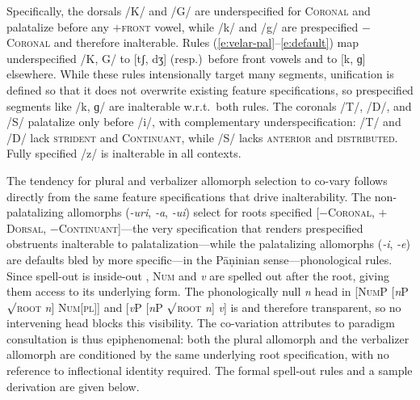 \documentclass[11pt,letterpaper]{article}
\newcommand{\feature}[1]{\textsc{#1}}
\newcommand{\featspec}[2]{\ensuremath{#1}\textsc{#2}}
\begin{document}
Specifically, the dorsals /K/ and /G/ are underspecified for \feature{Coronal} and palatalize before any \featspec{+}{front} vowel,
while /k/ and /g/ are prespecified \featspec{-}{Coronal} and therefore inalterable.
Rules (\ref{e:velar-pal}--\ref{e:default}) map underspecified /K, G/ to [tʃ, dʒ] (resp.)~before front vowels and to [k, ɡ] elsewhere.
While these rules intensionally target many segments,
unification is defined so that it does not overwrite existing feature specifications,
so prespecified segments like /k, ɡ/ are inalterable w.r.t.~both rules.
The coronals /T/, /D/, and /S/ palatalize only before /i/, with complementary underspecification:
/T/ and /D/ lack \feature{strident} and \feature{Continuant},
while /S/ lacks \feature{anterior} and \feature{distributed}.
Fully specified /z/ is inalterable in all contexts.

The tendency for plural and verbalizer allomorph selection to co-vary follows directly from the same feature specifications that drive inalterability.
The non-palatalizing allomorphs (\textit{-uri}, \textit{-a}, \textit{-ui}) select for roots specified
[\featspec{-}{Coronal}, \featspec{+}{Dorsal}, \featspec{-}{Continuant}]---the very specification that renders prespecified obstruents inalterable to palatalization---while the palatalizing allomorphs (\textit{-i}, \textit{-e}) are defaults bled by more specific---in the Pāṇinian sense---phonological rules.
Since spell-out is inside-out \citep{Bobaljik:00},
\textsc{Num} and \textit{v} are spelled out after the root,
giving them access to its underlying form.
The phonologically null \textit{n} head in
[\textsc{NumP} [\textit{n}P $\surd$\textsc{root} \textit{n}] \textsc{Num}[\textsc{pl}]]
and [\textit{v}P [\textit{n}P $\surd$\textsc{root} \textit{n}] \textit{v}] is  \citep{Embick:03} and therefore transparent,
so no intervening head blocks this visibility.
The co-variation \citeauthor{Steriade:08} attributes to paradigm consultation is thus epiphenomenal:
both the plural allomorph and the verbalizer allomorph are conditioned by the same underlying root specification, with no reference to inflectional identity required.
The formal spell-out rules and a sample derivation are given below.
\end{document}
